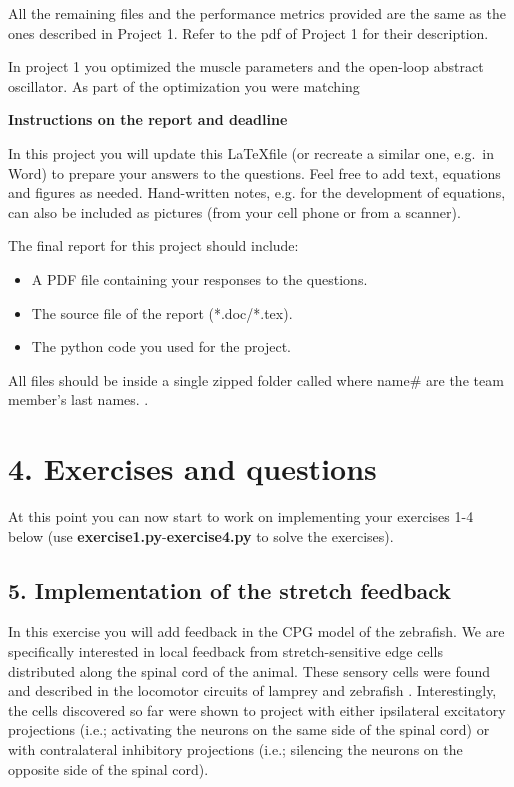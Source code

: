 \documentclass{cmc}
\begin{document}
All the remaining files and the performance metrics provided are the same as the ones described in Project 1. Refer to the pdf of Project 1 for their description.

In project 1 you optimized the muscle parameters and the open-loop abstract oscillator. As part of the optimization you were matching


\textbf{Instructions on the report and deadline}

In this project you will update this \LaTeX \space file (or recreate a similar one, e.g.\ in Word) to prepare your answers to the questions. Feel free to add text, equations and figures as needed. Hand-written notes, e.g. for the development of equations, can also be included as pictures (from your cell phone or from a scanner).

The final report for this project should include:

\begin{itemize}
    \item A PDF file containing your responses to the questions.
    \item The source file of the report (*.doc/*.tex).
    \item The python code you used for the project.
\end{itemize}

All files should be inside a single zipped folder called  where name\# are the team member's last names. .

\textit{
  \textbf{}
}

\section*{4. Exercises and questions}
At this point you can now start to work on implementing your exercises 1-4 below (use \textbf{exercise1.py}-\textbf{exercise4.py} to solve the exercises).

\subsection*{5. Implementation of the stretch feedback} \label{subsec:wavecontroller}
In this exercise you will add feedback in the CPG model of the zebrafish. We are specifically interested in local feedback from stretch-sensitive edge
cells distributed along the spinal cord of the animal. These sensory cells were found and described in the locomotor circuits of lamprey \cite{grillner1984edge} and zebrafish \cite{picton_spinal_2021}. Interestingly, the cells discovered so far were shown to project with either ipsilateral excitatory projections (i.e.; activating the neurons on the same side of the spinal cord) or with contralateral inhibitory projections (i.e.; silencing the neurons on the opposite side of the spinal cord).
\end{document}
